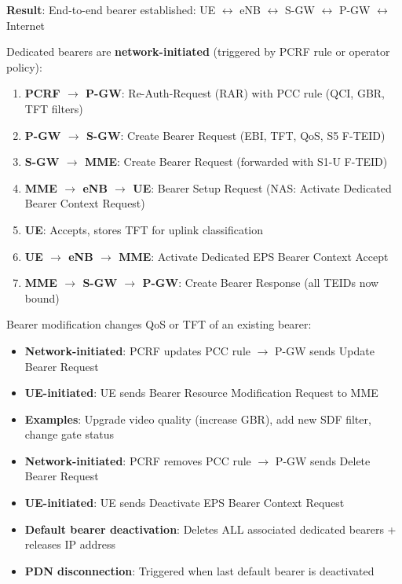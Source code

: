 \textbf{Result}: End-to-end bearer established: UE \ensuremath{\leftrightarrow} eNB \ensuremath{\leftrightarrow} S-GW \ensuremath{\leftrightarrow} P-GW \ensuremath{\leftrightarrow} Internet


Dedicated bearers are \textbf{network-initiated} (triggered by PCRF rule or operator policy):

\begin{enumerate}
\def\labelenumi{\arabic{enumi}.}
\tightlist
\item
  \textbf{PCRF \ensuremath{\to} P-GW}: Re-Auth-Request (RAR) with PCC rule (QCI, GBR, TFT filters)
\item
  \textbf{P-GW \ensuremath{\to} S-GW}: Create Bearer Request (EBI, TFT, QoS, S5 F-TEID)
\item
  \textbf{S-GW \ensuremath{\to} MME}: Create Bearer Request (forwarded with S1-U F-TEID)
\item
  \textbf{MME \ensuremath{\to} eNB \ensuremath{\to} UE}: Bearer Setup Request (NAS: Activate Dedicated Bearer Context Request)
\item
  \textbf{UE}: Accepts, stores TFT for uplink classification
\item
  \textbf{UE \ensuremath{\to} eNB \ensuremath{\to} MME}: Activate Dedicated EPS Bearer Context Accept
\item
  \textbf{MME \ensuremath{\to} S-GW \ensuremath{\to} P-GW}: Create Bearer Response (all TEIDs now bound)
\end{enumerate}


Bearer modification changes QoS or TFT of an existing bearer:

\begin{itemize}
\tightlist
\item
  \textbf{Network-initiated}: PCRF updates PCC rule \ensuremath{\to} P-GW sends Update Bearer Request
\item
  \textbf{UE-initiated}: UE sends Bearer Resource Modification Request to MME
\item
  \textbf{Examples}: Upgrade video quality (increase GBR), add new SDF filter, change gate status
\end{itemize}


\begin{itemize}
\tightlist
\item
  \textbf{Network-initiated}: PCRF removes PCC rule \ensuremath{\to} P-GW sends Delete Bearer Request
\item
  \textbf{UE-initiated}: UE sends Deactivate EPS Bearer Context Request
\item
  \textbf{Default bearer deactivation}: Deletes ALL associated dedicated bearers + releases IP address
\item
  \textbf{PDN disconnection}: Triggered when last default bearer is deactivated
\end{itemize}

